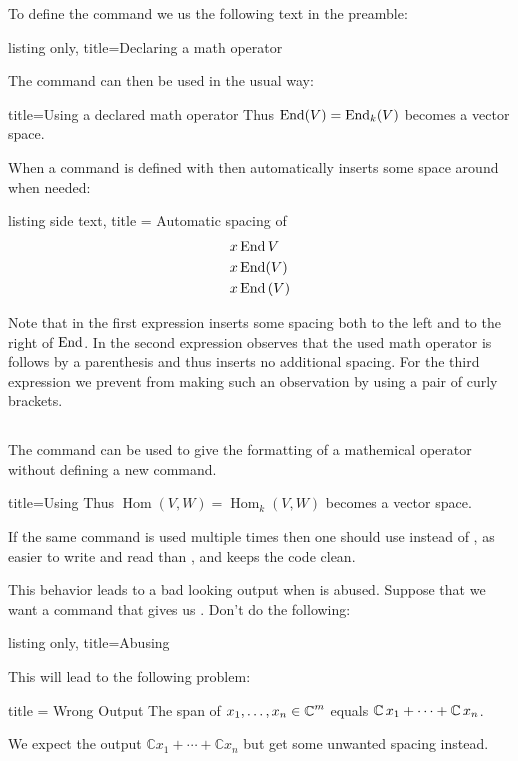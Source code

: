 \documentclass[a4paper, 10pt, headings=standardclasses, oneside, bibliography=totocnumbered]{scrbook}
\begin{document}
To define the command  we us the following text in the preamble:
\begin{tcblisting}{listing only, title={Declaring a math operator}}
\DeclareMathOperator{\End}{End}
\end{tcblisting}
The command  can then be used in the usual way:
\begin{tcblisting}{title={Using a declared math operator}}
Thus $\End(V) = \End_k(V)$ becomes a vector space.
\end{tcblisting}
When a command  is defined with  then  automatically inserts some space around  when needed:
\begin{tcblisting}{listing side text, title = Automatic spacing of }
\begin{align*}
&x \End V
\\
&x \End(V)
\\
&x \End {(V)}
\end{align*}
\end{tcblisting}
Note that in the first expression  inserts some spacing both to the left and to the right of $\End$.
In the second expression  observes that the used math operator is follows by a parenthesis and thus inserts no additional spacing.
For the third expression we prevent  from making such an observation by using a pair of curly brackets.


\subsection{}

The command  can be used to give the formatting of a mathemical operator without defining a new command.
\begin{tcblisting}{title={Using }}
Thus $\operatorname{Hom}(V,W) = \operatorname{Hom}_k(V,W)$ becomes a vector space.
\end{tcblisting}
If the same command is used multiple times then one should use  instead of , as  easier to write and read than , and keeps the code clean.

This behavior leads to a bad looking output when  is abused.
Suppose that we want a command  that gives us .
Don’t do the following:
\begin{tcblisting}{listing only, title={Abusing }}
\DeclareMathOperator{\Complex}{\mathbb{C}}
\end{tcblisting}
This will lead to the following problem:
\begin{tcblisting}{title = {Wrong Output}}
The span of $x_1, \dotsc, x_n \in \Complex^m$ equals $\Complex x_1 + \dotsb + \Complex x_n$.
\end{tcblisting}
We expect the output $\mathbb{C} x_1 + \dotsb + \mathbb{C} x_n$ but get some unwanted spacing instead.
\end{document}
